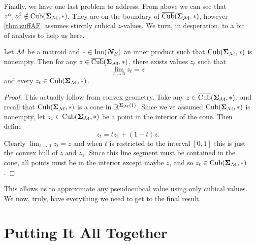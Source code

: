 \documentclass[12pt,oneside]{../../sfsuthesis}
\begin{document}
Finally, we have one last problem to address.
From above we can see that \(  z^\alpha, z^\beta \notin \operatorname{Cub}(\bm{\Sigma}_{\mathcal{M}}, \ast) \).
They are on the boundary of \( \operatorname{\overline{Cub}}(\bm{\Sigma}_{\mathcal{M}}, \ast) \), however \th\ref{thm:suffAF} assumes stirctly cubical \( z \)-values.
We turn, in desperation, to a bit of analysis to help us here.
\begin{lemma}\th\label{thm:cubeLimit}
    Let \( \mathcal{M} \) be a matroid and \( \ast \in \operatorname{Inn}(\bm{N}_E) \) an inner product such that \( \operatorname{Cub}( \bm{\Sigma}_{\mathcal{M}}, \ast) \) is nonempty.
    Then for any \( z \in \operatorname{\overline{Cub}}(\bm{\Sigma}_{\mathcal{M}}, \ast) \), there exists values \( z_t \) such that
    \[
        \lim_{t \to 0} z_t = z
    \]
    and every \( z_t \in \operatorname{Cub}(\bm{\Sigma}_{\mathcal{M}}, \ast) \).
\end{lemma}
\begin{proof}
    This actually follow from convex geometry.
    Take any \( z \in \operatorname{\overline{Cub}}( \bm{\Sigma}_{\mathcal{M}}, \ast) \), and recall that \(  \operatorname{Cub}( \bm{\Sigma}_{\mathcal{M}}, \ast) \) is a cone in \( \mathbb{R}^{\bm{\Sigma}_{\mathcal{M}}(1)} \).
    Since we've assumed \( \operatorname{Cub}( \bm{\Sigma}_{\mathcal{M}}, \ast) \) is nonempty, let \( z_1 \in \operatorname{Cub}( \bm{\Sigma}_{\mathcal{M}}, \ast) \) be a point in the interior of the cone.
    Then define
    \[
        z_t = t z_1 + (1 - t)z.
    \]
    Clearly \( \lim_{t \to 0} z_t = z \) and when \( t \) is restricted to the interval \( [0,1] \) this is just the convex hull of \( z \) and \( z_1 \).
    Since this line segment must be contained in the cone, all points must be in the interior except maybe \( z \), and so \( z_t \in \operatorname{Cub}( \bm{\Sigma}_{\mathcal{M}}, \ast) \).
\end{proof}
This allows us to approximate any pseudocubcal value using only cubical values.
We now, truly, have everything we need to get to the final result.

\section{Putting It All Together}
\end{document}
